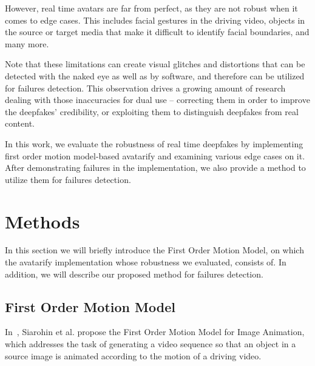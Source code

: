\documentclass[english,12pt]{article}
\begin{document}
However, real time avatars are far from perfect, as they are not robust when it comes to edge cases.
This includes facial gestures in the driving video, objects in the source or target media that make it
difficult to identify facial boundaries, and many more.


Note that these limitations can create visual glitches and distortions that can be detected with the
naked eye as well as by software, and therefore can be utilized for failures detection. This observation
drives a growing amount of research dealing with those inaccuracies for dual use -- correcting them in
order to improve the deepfakes' credibility, or exploiting them to distinguish deepfakes from real content.

In this work, we evaluate the robustness of real time deepfakes by implementing first order motion
model-based avatarify and examining various edge cases on it. After demonstrating failures in the
implementation, we also provide a method to utilize them for failures detection.



\section{Methods} \label{methods}

In this section we will briefly introduce the First Order Motion Model, on which the avatarify implementation
whose robustness we evaluated, consists of. In addition, we will describe our proposed method for failures detection.

\subsection{First Order Motion Model} \label{implementation}


In~\cite{DBLP:journals/corr/abs-2003-00196}, Siarohin et al. propose the First Order Motion Model for Image
Animation, which addresses the task of generating a video sequence so that an object in a source image
is animated according to the motion of a driving video.
\end{document}
